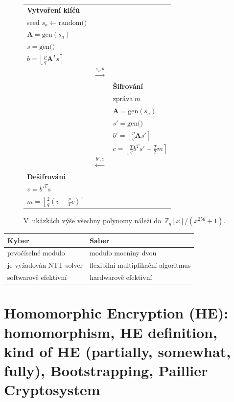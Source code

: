 \begin{figure}[ht]
\begin{minipage}[t]{0.5\textwidth}
        \begin{tabular}{lcl}
        \textbf{Vytvoření klíčů} && \\
        seed $s_a \leftarrow \text{random()}$ && \\
        $\textbf{A} = \text{gen}(s_a)$ && \\
        $s = \text{gen()}$ && \\
        $b = \left\lfloor \frac{p}{q} \textbf{A}^T s \right\rceil$ && \\
        & $\stackrel{s_a, b}{\longrightarrow}$ & \\
        && \textbf{Šifrování} \\
        && $\text{zpráva}\ m$ \\
        && $\textbf{A} = \text{gen}(s_a)$ \\
        && $s' = \text{gen()}$ \\
        && $b' = \left\lfloor \frac{p}{q} \textbf{A} s' \right\rceil$ \\
        && $c = \left\lfloor \frac{T}{q} b^T s' + \frac{T}{2} m \right\rceil$ \\
        & $\stackrel{b', c}{\longleftarrow}$ & \\
        \textbf{Dešifrování} && \\
        $v = b'^T s$ && \\
        $m = \left\lfloor \frac{2}{q} (v - \frac{p}{T} c) \right\rceil$ && \\
        \end{tabular}
    \end{minipage}

    \vspace*{1em}
    V~ukázkách výše všechny polynomy náleží do~$\mathbb{Z}_q[x]/(x^{256}+1)$.
\end{figure}

\begin{table}[ht]
    \centering
    \begin{tabular}{|l|l|}
    \textbf{Kyber} & \textbf{Saber} \\
    \hline \hline
    prvočíselné modulo & modulo mocniny dvou \\
    je vyžadován NTT solver & flexibilní multiplikační algoritmus \\
    softwarově efektivní & hardwarově efektivní \\
    \end{tabular}
\end{table}


\clearpage
\section{Homomorphic Encryption (HE): homomorphism, HE definition, kind of HE (partially, somewhat, fully), Bootstrapping, Paillier Cryptosystem}

